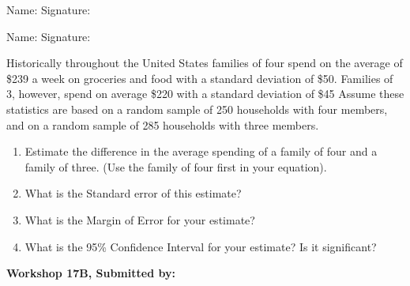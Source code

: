 \documentclass[11pt, chapterprefix=true]{scrbook}\usepackage[]{graphicx}\usepackage[]{color}
\begin{document}
\begin{exercises}
\begin{exercise}
\begin{center}
{{\vspace{4mm}
Name: \underline{\phantom{xxxxxxxxxxxxxxxxxxxxxxxx}} Signature: \underline{\phantom{xxxxxxxxxxxxxxxxxxxxxxxx}}

\vspace{4mm}
Name: \underline{\phantom{xxxxxxxxxxxxxxxxxxxxxxxx}} Signature: \underline{\phantom{xxxxxxxxxxxxxxxxxxxxxxxx}}
 }}
\end{center}

Historically throughout the United States families of four spend on the average of \$239 a week on groceries and food with a standard deviation of \$50. Families of 3, however, spend on average \$220 with a standard deviation of \$45 Assume these statistics are based on a random sample of 250 households with four members, and on a random sample of 285 households with three members.

\begin{enumerate}
\item  Estimate the difference in the average spending of a family of four and a family of three. (Use the family of four first in your equation).
\item  What is the Standard error of this estimate?
\item  What is the Margin of Error for your estimate?
\item  What is the 95\% Confidence Interval for your estimate? Is it significant?
\end{enumerate}

\end{exercise}
\begin{solution}  %

\end{solution}

\clearpage

    \begin{exercise}  %

    \begin{center}
\begin{flushleft}\textbf{\large \hfill Workshop 17B, Submitted by: }\end{flushleft}

\end{center}
\end{exercise}
\end{exercises}
\end{document}
